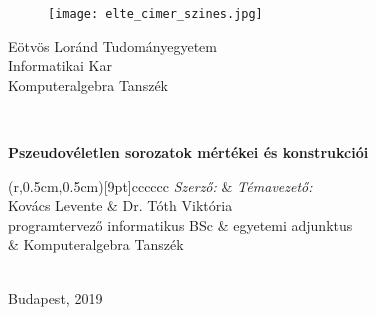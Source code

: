 \documentclass[12pt]{article}
\begin{document}
	\begin{titlepage}
		\begin{minipage}{0.36\textwidth}
			\begin{figure}[H]
				\texttt{[image: elte\_cimer\_szines.jpg]}
			\end{figure}
		\end{minipage}
		\begin{minipage}{0.60\textwidth}
			\begin{center}
				{\Large Eötvös Loránd Tudományegyetem \\
					Informatikai Kar \\
					Komputeralgebra Tanszék \\}
			\end{center}
		\end{minipage}
		\\[0.3\baselineskip]
		\noindent\makebox[\linewidth]{\rule{\textwidth}{0.5pt}}
		\vspace*{\fill}
		\centering
		\vspace*{0.5cm}
		
		\huge\bfseries
		Pszeudovéletlen sorozatok mértékei és konstrukciói		
		\vspace*{0.5cm}
		
		\vspace*{\fill}
		\begin{TAB}(r,0.5cm,0.5cm)[9pt]{cc}{cccc}
			\normalfont \normalsize \textsl{ Szerző: } & \normalfont \normalsize \textsl{ Témavezető: } \\
			\normalsize Kovács Levente & \normalsize Dr. Tóth Viktória \\
			\normalfont \normalsize programtervező informatikus BSc & \normalfont \normalsize egyetemi adjunktus \\
			\normalsize & \normalfont \normalsize Komputeralgebra Tanszék
		\end{TAB}
		\\
		\large \normalfont Budapest, 2019
	\end{titlepage}
	
\end{document}
